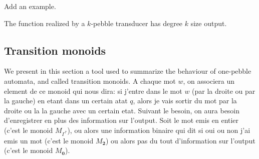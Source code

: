 \begin{comment}

\begin{definition}
  We define, by induction on $k$ the function, realized by a $k$-pebble automaton. The case $k=1$ has been treated in Definition~\ref{def:1pebble}. 
  
  Consider a $k+1$ pebble transducer $\Tt$. We set $Q_i$ to be the set of states of $\Tt_i$.
  Let us define the image of a word $w$ of $\Sigma^*$ by the transduction realized by $\Tt$.
  
  \noindent Let $r=(q_j,\mathsf{pos}_j)_{j\in[1, n]}$ be the accepting run of $\Tt_{k+1}$ over $w$ and $(o_j)_{j\in[1, n]}$ be the outputs of the corresponding configurations.
  
  \noindent For every $q\in Q_i$, let $f^i_q:\Sigma_{[k,i+1]}^*\rightarrow \Gamma^*$ be the transduction realized by $\Tt[1,i]$, considering $q$ as its initial state.
   
   For every $j\in[1,n]$, let $w_j$ be the word obtained from $w$ by replacing the letter $a$ at position $\mathsf{pos}_j$ by $(a,k+1)$.
      For every $j\in[1,n]$, let $u_j$ be the word obtained from $o_j$ by replacing every state $q\in Q_i$ by $f^i_q(w_j)$.
      
  The image of $w$ by $\Tt$ is the word $(u_j)_{j\in[1,n]}$.
  \end{definition}

    
\end{comment}

\begin{example}
\begin{center}
Add an example.
\end{center}
\end{example}



\begin{proposition}[\cite{}]
The function realized by a $k$-pebble transducer has degree $k$ size output.
\end{proposition}

\subsection{Transition monoids}
We present in this section a tool used to summarize the behaviour of one-pebble automata, and called transition monoids. A chaque mot $w$, on associera un element de ce monoid qui nous dira: si j'entre dans le mot $w$ (par la droite ou par la gauche) en etant dans un certain atat $q$, alors je vais sortir du mot par la droite ou la  la gauche avec un certain etat. Suivant le besoin, on aura besoin d'enregistrer en plus des information sur l'output. Soit le mot emis en entier (c'est le monoid $M_{\Gamma^*}$), ou alors une information binaire qui dit si oui ou non j'ai emis un mot (c'est le monoid $M_{\mathbf{2}}$) ou alors pas du tout d'information sur l'output (c'est le monoid $M_{\mathbf{0}}$).

